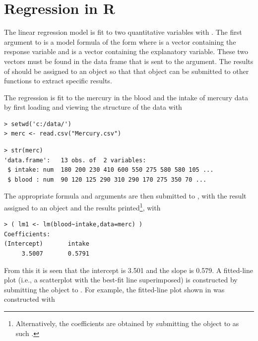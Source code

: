 \documentclass[10pt,openany]{book}\usepackage[]{graphicx}\usepackage[]{color}
\makeatletter
\newenvironment{kframe}{%
 \def\at@end@of@kframe{}%
 \ifinner\ifhmode%
  \def\at@end@of@kframe{\end{minipage}}%
  \begin{minipage}{\columnwidth}%
 \fi\fi%
 \def\FrameCommand##1{\hskip\@totalleftmargin \hskip-\fboxsep
 \colorbox{shadecolor}{##1}\hskip-\fboxsep
     \hskip-\linewidth \hskip-\@totalleftmargin \hskip\columnwidth}%
 \MakeFramed {\advance\hsize-\width
   \@totalleftmargin\z@ \linewidth\hsize
   \@setminipage}}%
 {\par\unskip\endMakeFramed%
 \at@end@of@kframe}
\newenvironment{knitrout}{}{} %
\makeatother
\begin{document}
\section{Regression in R}
The linear regression model is fit to two quantitative variables with .  The first argument to  is a model formula of the form  where  is a vector containing the response variable and  is a vector containing the explanatory variable.  These two vectors must be found in the data frame that is sent to the  argument.  The results of  should be assigned to an object so that that object can be submitted to other functions to extract specific results.


The regression is fit to the mercury in the blood and the intake of mercury data by first loading and viewing the structure of the data with
\begin{knitrout}
\color{fgcolor}\begin{kframe}
\begin{verbatim}
> setwd('c:/data/')
> merc <- read.csv("Mercury.csv")
\end{verbatim}
\end{kframe}
\end{knitrout}
\vspace{-12pt}
\begin{knitrout}
\color{fgcolor}\begin{kframe}
\begin{verbatim}
> str(merc)
'data.frame':	13 obs. of  2 variables:
 $ intake: num  180 200 230 410 600 550 275 580 580 105 ...
 $ blood : num  90 120 125 290 310 290 170 275 350 70 ...
\end{verbatim}
\end{kframe}
\end{knitrout}
The appropriate formula and  arguments are then submitted to , with the result assigned to an object and the results printed\footnote{Alternatively, the coefficients are obtained by submitting the  object to  as such .}, with
\begin{knitrout}
\color{fgcolor}\begin{kframe}
\begin{verbatim}
> ( lm1 <- lm(blood~intake,data=merc) )
Coefficients:
(Intercept)       intake  
     3.5007       0.5791  
\end{verbatim}
\end{kframe}
\end{knitrout}
From this it is seen that the intercept is 3.501 and the slope is 0.579.  A fitted-line plot (i.e., a scatterplot with the best-fit line superimposed) is constructed by submitting the  object to .  For example, the fitted-line plot shown in  was constructed with
\end{document}
